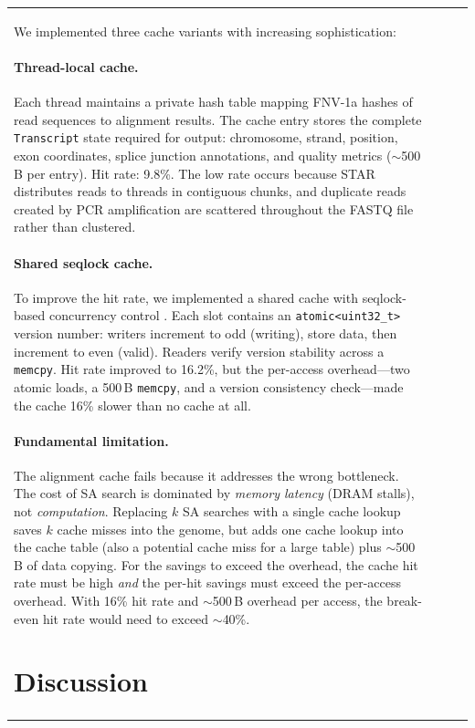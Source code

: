 \documentclass[11pt,twocolumn]{article}
\begin{document}
\begin{table}[t]
\begin{tabular}{@{}lrrr@{}}
We implemented three cache variants with increasing sophistication:

\paragraph{Thread-local cache.} Each thread maintains a private hash table mapping FNV-1a hashes of read sequences to alignment results. The cache entry stores the complete \texttt{Transcript} state required for output: chromosome, strand, position, exon coordinates, splice junction annotations, and quality metrics ($\sim$500\,B per entry). Hit rate: 9.8\%. The low rate occurs because STAR distributes reads to threads in contiguous chunks, and duplicate reads created by PCR amplification are scattered throughout the FASTQ file rather than clustered.

\paragraph{Shared seqlock cache.} To improve the hit rate, we implemented a shared cache with seqlock-based concurrency control \citep{lameter2005effective}. Each slot contains an \texttt{atomic<uint32\_t>} version number: writers increment to odd (writing), store data, then increment to even (valid). Readers verify version stability across a \texttt{memcpy}. Hit rate improved to 16.2\%, but the per-access overhead---two atomic loads, a 500\,B \texttt{memcpy}, and a version consistency check---made the cache 16\% slower than no cache at all.

\paragraph{Fundamental limitation.} The alignment cache fails because it addresses the wrong bottleneck. The cost of SA search is dominated by \emph{memory latency} (DRAM stalls), not \emph{computation}. Replacing $k$ SA searches with a single cache lookup saves $k$ cache misses into the genome, but adds one cache lookup into the cache table (also a potential cache miss for a large table) plus $\sim$500\,B of data copying. For the savings to exceed the overhead, the cache hit rate must be high \emph{and} the per-hit savings must exceed the per-access overhead. With 16\% hit rate and $\sim$500\,B overhead per access, the break-even hit rate would need to exceed $\sim$40\%.

\section{Discussion}


\end{tabular}
\end{table}
\end{document}
